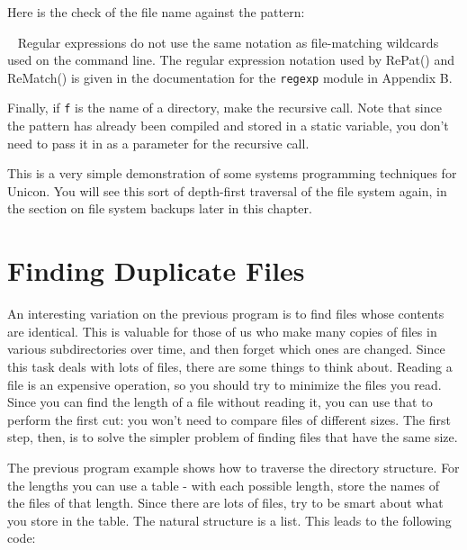Here is the check of the file name against the pattern:


\bigskip{}\
{\sffamily
Regular expressions do not use the same notation as file-matching
wildcards used on the command line. The regular expression notation
used by RePat() and ReMatch() is given in the documentation for the
\texttt{regexp} module in Appendix B.}

Finally, if \texttt{f} is the name of a directory, make the recursive
call. Note that since the pattern has already been compiled and stored
in a static variable, you don't need to pass it in as
a parameter for the recursive call.


This is a very simple demonstration of some systems programming
techniques for Unicon. You will see this sort of depth-first traversal
of the file system again, in the section on file system backups later
in this chapter.

\section{Finding Duplicate Files}

An interesting variation on the previous program is to find files whose
contents are identical. This is valuable for those of us who make many
copies of files in various subdirectories over time, and then forget
which ones are changed. Since this task deals with lots of files, there
are some things to think about. Reading a file is an expensive
operation, so you should try to minimize the files you read. Since you
can find the length of a file without reading it, you can use that to
perform the first cut: you won't need to compare files
of different sizes. The first step, then, is to solve the simpler
problem of finding files that have the same size.

The previous program example shows how to traverse the directory
structure. For the lengths you can use a table - with each possible
length, store the names of the files of that length. Since there are
lots of files, try to be smart about what you store in the table. The
natural structure is a list. This leads to the following code:

